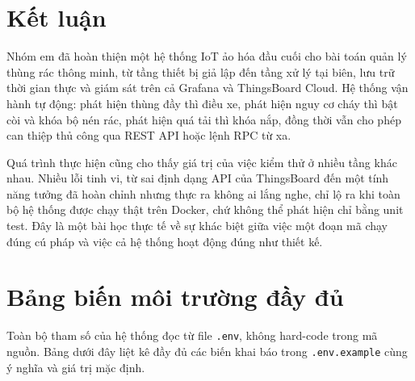 \documentclass[12pt,a4paper]{article}
\begin{document}
\section{Kết luận}

Nhóm em đã hoàn thiện một hệ thống IoT ảo hóa đầu cuối cho bài toán quản lý thùng rác thông minh, từ tầng thiết bị giả lập đến tầng xử lý tại biên, lưu trữ thời gian thực và giám sát trên cả Grafana và ThingsBoard Cloud. Hệ thống vận hành tự động: phát hiện thùng đầy thì điều xe, phát hiện nguy cơ cháy thì bật còi và khóa bộ nén rác, phát hiện quá tải thì khóa nắp, đồng thời vẫn cho phép can thiệp thủ công qua REST API hoặc lệnh RPC từ xa.

Quá trình thực hiện cũng cho thấy giá trị của việc kiểm thử ở nhiều tầng khác nhau. Nhiều lỗi tinh vi, từ sai định dạng API của ThingsBoard đến một tính năng tưởng đã hoàn chỉnh nhưng thực ra không ai lắng nghe, chỉ lộ ra khi toàn bộ hệ thống được chạy thật trên Docker, chứ không thể phát hiện chỉ bằng unit test. Đây là một bài học thực tế về sự khác biệt giữa việc một đoạn mã chạy đúng cú pháp và việc cả hệ thống hoạt động đúng như thiết kế.

\appendix
\section{Bảng biến môi trường đầy đủ}

Toàn bộ tham số của hệ thống đọc từ file \texttt{.env}, không hard-code trong mã nguồn. Bảng dưới đây liệt kê đầy đủ các biến khai báo trong \texttt{.env.example} cùng ý nghĩa và giá trị mặc định.
\end{document}
